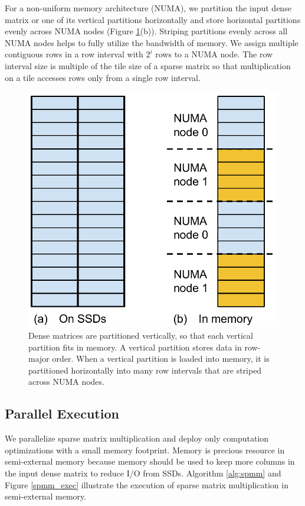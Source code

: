 For a non-uniform memory architecture (NUMA), we partition the input dense matrix
or one of its vertical partitions horizontally and store horizontal partitions
evenly across NUMA nodes (Figure \ref{dense_mat}(b)). Striping partitions evenly
across all NUMA nodes helps to fully utilize the bandwidth of memory.
We assign multiple contiguous rows in a row interval with $2^i$ rows to
a NUMA node. The row interval size is multiple of the tile size of
a sparse matrix so that multiplication on a tile accesses rows only
from a single row interval.

\begin{figure}
\centering
\includegraphics[scale=0.4]{SpMM_figs/dense_matrix.pdf}
\caption{Dense matrices are partitioned
vertically, so that each vertical partition fits in memory. A vertical
partition stores data in row-major order. When a vertical partition is loaded
into memory, it is partitioned horizontally into many row intervals that
are striped across NUMA nodes.}
\label{dense_mat}
\end{figure}

\subsection{Parallel Execution} \label{sec:exec}
We parallelize sparse matrix multiplication and deploy only computation
optimizations with a small memory footprint. Memory is precious resource
in semi-external memory because memory should be used to keep more columns
in the input dense matrix to reduce I/O from SSDs.
Algorithm \ref{alg:spmm} and Figure \ref{spmm_exec} illustrate the execution of
sparse matrix multiplication in semi-external memory.


